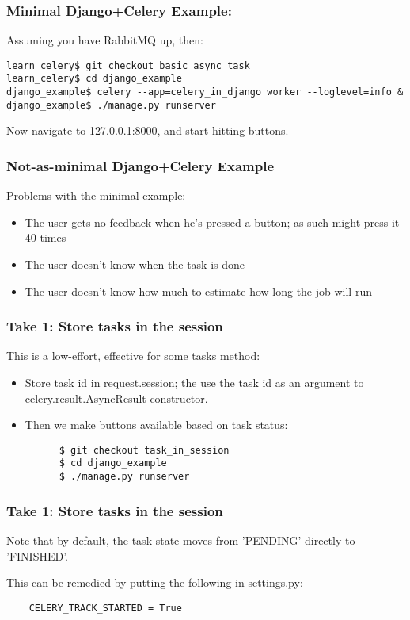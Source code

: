 \documentclass[9pt]{beamer}
\begin{document}
\begin{frame}[fragile]
  \frametitle{Minimal Django+Celery Example:}
  Assuming you have RabbitMQ up, then:
  \begin{verbatim}
learn_celery$ git checkout basic_async_task
learn_celery$ cd django_example
django_example$ celery --app=celery_in_django worker --loglevel=info &
django_example$ ./manage.py runserver
  \end{verbatim}
  Now navigate to 127.0.0.1:8000, and start hitting buttons.
\end{frame}

\begin{frame}[fragile]
  \frametitle{Not-as-minimal Django+Celery Example}
  Problems with the minimal example:
  \begin{itemize}
  \item The user gets no feedback when he's pressed a button; as such might press it 40 times
    \pause
  \item The user doesn't know when the task is done
    \pause
  \item The user doesn't know how much to estimate how long the job will run
  \end{itemize}
\end{frame}

\begin{frame}[fragile]
  \frametitle{Take 1: Store tasks in the session}
  This is a low-effort, effective for some tasks method:
  \begin{itemize}
  \item Store task id in request.session; the use the task id as an argument to celery.result.AsyncResult constructor.
    \pause
  \item Then we make buttons available based on task status:
    \begin{verbatim}
      $ git checkout task_in_session
      $ cd django_example
      $ ./manage.py runserver
    \end{verbatim}
  \end{itemize}
\end{frame}

\begin{frame}[fragile]
  \frametitle{Take 1: Store tasks in the session}
  Note that by default, the task state moves from 'PENDING' directly to 'FINISHED'.

  This can be remedied by putting the following in settings.py:
  \begin{verbatim}
    CELERY_TRACK_STARTED = True
  \end{verbatim}
\end{frame}
\end{document}
